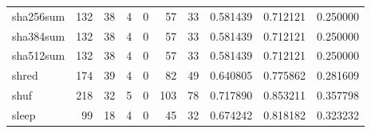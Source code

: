 \begin{tabular}{lrrrrrrrrr}
sha256sum &                                                132 &                                                 38 &                                                  4 &                                                  0 &                                                 57 &                                                 33 &                                           0.581439 &                               0.712121 &                             0.250000 \\
sha384sum &                                                132 &                                                 38 &                                                  4 &                                                  0 &                                                 57 &                                                 33 &                                           0.581439 &                               0.712121 &                             0.250000 \\
sha512sum &                                                132 &                                                 38 &                                                  4 &                                                  0 &                                                 57 &                                                 33 &                                           0.581439 &                               0.712121 &                             0.250000 \\
shred     &                                                174 &                                                 39 &                                                  4 &                                                  0 &                                                 82 &                                                 49 &                                           0.640805 &                               0.775862 &                             0.281609 \\
shuf      &                                                218 &                                                 32 &                                                  5 &                                                  0 &                                                103 &                                                 78 &                                           0.717890 &                               0.853211 &                             0.357798 \\
sleep     &                                                 99 &                                                 18 &                                                  4 &                                                  0 &                                                 45 &                                                 32 &                                           0.674242 &                               0.818182 &                             0.323232 \\

\end{tabular}
